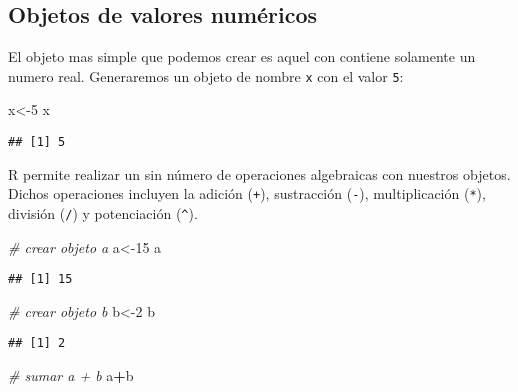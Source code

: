 \documentclass[]{book}
\newenvironment{Shaded}{\begin{snugshade}}{\end{snugshade}}
\newcommand{\CommentTok}[1]{\textcolor[rgb]{0.56,0.35,0.01}{\textit{#1}}}
\newcommand{\DecValTok}[1]{\textcolor[rgb]{0.00,0.00,0.81}{#1}}
\newcommand{\NormalTok}[1]{#1}
\newcommand{\OperatorTok}[1]{\textcolor[rgb]{0.81,0.36,0.00}{\textbf{#1}}}
\begin{document}
\hypertarget{objetos-de-valores-numericos}{%
\subsection{Objetos de valores numéricos}\label{objetos-de-valores-numericos}}

El objeto mas simple que podemos crear es aquel con contiene solamente un numero real. Generaremos un objeto de nombre \texttt{x} con el valor \texttt{5}:

\begin{Shaded}
\begin{Highlighting}[]
\NormalTok{x<-}\DecValTok{5}
\NormalTok{x}
\end{Highlighting}
\end{Shaded}

\begin{verbatim}
## [1] 5
\end{verbatim}

R permite realizar un sin número de operaciones algebraicas con nuestros objetos. Dichos operaciones
incluyen la adición (\texttt{+}), sustracción (\texttt{-}), multiplicación (\texttt{*}), división (\texttt{/}) y potenciación (\texttt{\^{}}).

\begin{Shaded}
\begin{Highlighting}[]
\CommentTok{# crear objeto a}
\NormalTok{a<-}\DecValTok{15}
\NormalTok{a}
\end{Highlighting}
\end{Shaded}

\begin{verbatim}
## [1] 15
\end{verbatim}

\begin{Shaded}
\begin{Highlighting}[]
\CommentTok{# crear objeto b}
\NormalTok{b<-}\DecValTok{2}
\NormalTok{b}
\end{Highlighting}
\end{Shaded}

\begin{verbatim}
## [1] 2
\end{verbatim}

\begin{Shaded}
\begin{Highlighting}[]
\CommentTok{# sumar a + b}
\NormalTok{a}\OperatorTok{+}\NormalTok{b}
\end{Highlighting}
\end{Shaded}
\end{document}
